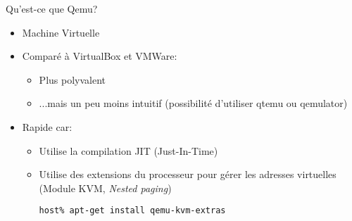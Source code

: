 \begin{frame}[fragile=singleslide]{Qu'est-ce que Qemu?}
  \begin{itemize}
  \item Machine Virtuelle
  \item Comparé à VirtualBox et VMWare:
    \begin{itemize}
    \item Plus polyvalent
    \item ...mais un peu  moins intuitif (possibilité d'utiliser qtemu
      ou qemulator)
    \end{itemize}
  \item Rapide car:
    \begin{itemize}
    \item Utilise la compilation JIT (Just-In-Time)
    \item Utilise des extensions du processeur pour gérer les
      adresses virtuelles (Module KVM, \emph{Nested paging})
      \begin{lstlisting}
host% apt-get install qemu-kvm-extras
      \end{lstlisting}
    \end{itemize}
  \end{itemize}
\end{frame}

